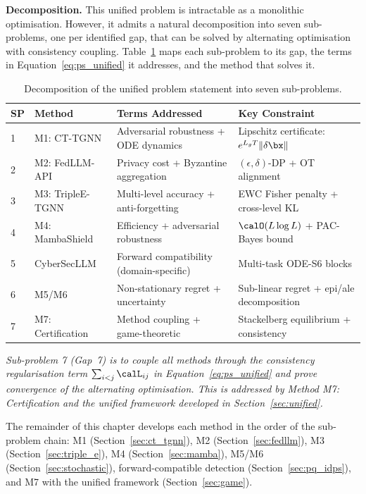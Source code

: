 \noindent\textbf{Decomposition.} This unified problem is intractable as a monolithic optimisation. However, it admits a natural decomposition into seven sub-problems, one per identified gap, that can be solved by alternating optimisation with consistency coupling. Table~\ref{tab:decomposition} maps each sub-problem to its gap, the terms in Equation~\eqref{eq:ps_unified} it addresses, and the method that solves it.

\begin{table}[htbp]
\centering
\caption{Decomposition of the unified problem statement into seven sub-problems.}
\label{tab:decomposition}
\small
\begin{tabular}{p{0.5cm} p{3.0cm} p{4.5cm} p{5.0cm}}
\toprule
\textbf{SP} & \textbf{Method} & \textbf{Terms Addressed} & \textbf{Key Constraint} \\
\midrule
1 & M1: CT-TGNN & Adversarial robustness + ODE dynamics & Lipschitz certificate: $e^{L_gT}\|\delta\bx\|$ \\
2 & M2: FedLLM-API & Privacy cost + Byzantine aggregation & $(\epsilon,\delta)$-DP + OT alignment \\
3 & M3: TripleE-TGNN & Multi-level accuracy + anti-forgetting & EWC Fisher penalty + cross-level KL \\
4 & M4: MambaShield & Efficiency + adversarial robustness & $\calO(L\log L)$ + PAC-Bayes bound \\
5 & CyberSecLLM & Forward compatibility (domain-specific) & Multi-task ODE-S6 blocks \\
6 & M5/M6 & Non-stationary regret + uncertainty & Sub-linear regret + epi/ale decomposition \\
7 & M7: Certification & Method coupling + game-theoretic & Stackelberg equilibrium + consistency \\
\bottomrule
\end{tabular}
\end{table}

\emph{Sub-problem 7 (Gap~7) is to couple all methods through the consistency regularisation term $\sum_{i<j}\calL_{ij}$ in Equation~\eqref{eq:ps_unified} and prove convergence of the alternating optimisation. This is addressed by Method M7: Certification and the unified framework developed in Section~\ref{sec:unified}.}

The remainder of this chapter develops each method in the order of the sub-problem chain: M1 (Section~\ref{sec:ct_tgnn}), M2 (Section~\ref{sec:fedllm}), M3 (Section~\ref{sec:triple_e}), M4 (Section~\ref{sec:mamba}), M5/M6 (Section~\ref{sec:stochastic}), forward-compatible detection (Section~\ref{sec:pq_idps}), and M7 with the unified framework (Section~\ref{sec:game}).



